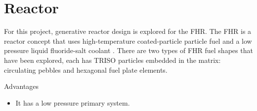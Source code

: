 \section{Reactor}
For this project, generative reactor design is explored for the 
\gls{FHR}. 
The \gls{FHR} is a reactor concept that uses high-temperature 
coated-particle particle fuel and a low pressure liquid fluoride-salt coolant 
\cite{forsberg_fluoride-salt-cooled_2012,facilitators_fluoride-salt-cooled_2013}.  
There are two types of \gls{FHR} fuel shapes that have been explored, 
each has \gls{TRISO} particles embedded in the matrix: circulating pebbles and 
hexagonal fuel plate elements.  

Advantages 
\begin{itemize}
    \item It has a low pressure primary system. 
\end{itemize}

